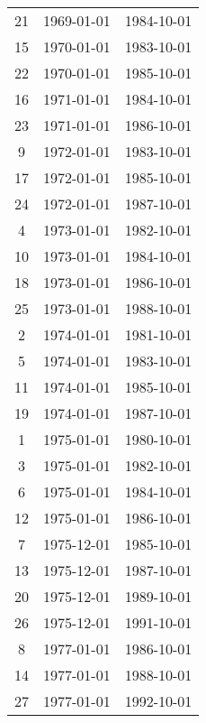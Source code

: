 % 
\begin{tabular}{ccc}
  \hline
  \hline
21 & 1969-01-01 & 1984-10-01 \\ 
  15 & 1970-01-01 & 1983-10-01 \\ 
  22 & 1970-01-01 & 1985-10-01 \\ 
  16 & 1971-01-01 & 1984-10-01 \\ 
  23 & 1971-01-01 & 1986-10-01 \\ 
  9 & 1972-01-01 & 1983-10-01 \\ 
  17 & 1972-01-01 & 1985-10-01 \\ 
  24 & 1972-01-01 & 1987-10-01 \\ 
  4 & 1973-01-01 & 1982-10-01 \\ 
  10 & 1973-01-01 & 1984-10-01 \\ 
  18 & 1973-01-01 & 1986-10-01 \\ 
  25 & 1973-01-01 & 1988-10-01 \\ 
  2 & 1974-01-01 & 1981-10-01 \\ 
  5 & 1974-01-01 & 1983-10-01 \\ 
  11 & 1974-01-01 & 1985-10-01 \\ 
  19 & 1974-01-01 & 1987-10-01 \\ 
  1 & 1975-01-01 & 1980-10-01 \\ 
  3 & 1975-01-01 & 1982-10-01 \\ 
  6 & 1975-01-01 & 1984-10-01 \\ 
  12 & 1975-01-01 & 1986-10-01 \\ 
  7 & 1975-12-01 & 1985-10-01 \\ 
  13 & 1975-12-01 & 1987-10-01 \\ 
  20 & 1975-12-01 & 1989-10-01 \\ 
  26 & 1975-12-01 & 1991-10-01 \\ 
  8 & 1977-01-01 & 1986-10-01 \\ 
  14 & 1977-01-01 & 1988-10-01 \\ 
  27 & 1977-01-01 & 1992-10-01 \\ 
   \hline
\end{tabular}
